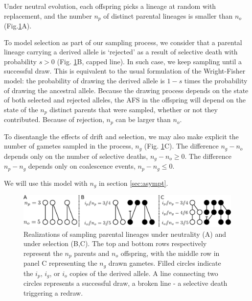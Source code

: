 \documentclass[review]{elsarticle}
\begin{document}
Under neutral evolution, each offspring picks a lineage at random with replacement, and the number
$n_p$ of distinct parental lineages is smaller than $n_o$ (Fig.\ref{fig:schematic}A).

To model selection as part of our sampling process, we consider that a parental lineage carrying a derived allele 
is `rejected' as a result of selective death with probability $s>0$
(Fig. \ref{fig:schematic}B, capped line). In such case, we keep sampling until a successful draw.  
This is equivalent to the usual formulation of the Wright-Fisher model: the probability of drawing 
the derived allele is $1-s$ times the probability of drawing the ancestral allele. 
Because the drawing process depends on the state of both selected and rejected alleles, 
the AFS in the offspring will depend on the state of the $n_p$ distinct parents that were sampled,
whether or not they contributed. Because of rejection, $n_p$ can be larger than $n_o.$

To disentangle the effects of drift and selection, we may also make explicit the number of gametes
sampled in the process, $n_g$ (Fig. \ref{fig:schematic}C). The difference $n_g-n_o$ depends only on the
number of selective deaths, $n_g-n_o \ge 0$. The difference $n_p-n_g$ depends only on
coalescence events, $n_p-n_g \le 0$.

We will use this model with $n_g$ in section
\ref{sec:asympt}.

\begin{figure}[h]
  \centering
  \includegraphics[width=1.0\textwidth]{fig/schematic.pdf}
  \caption{\label{fig:schematic} Realizations of sampling parental lineages under neutrality (A) and
    under selection (B,C). The top and bottom rows respectively represent the $n_p$ parents and $n_o$ offspring, 
    with the middle row in panel C representing the $n_g$ drawn gametes.
    Filled circles indicate the $i_p$, $i_g$, or $i_o$ copies of the derived allele. A line connecting
    two circles represents a successful draw, a broken line - a selective death triggering a redraw.
    }
\end{figure}
\end{document}
